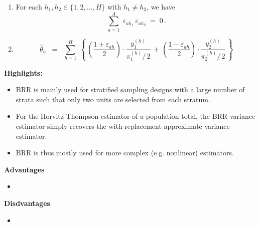\begin{proposition}
\begin{enumerate}
\item
	For each $h_{1}, h_{2} \in \{1,2,\ldots,H\}$ with $h_{1} \neq h_{2}$, we have
	\begin{equation*}
	\overset{A}{\underset{a=1}{\sum}}\;\varepsilon_{ah_{1}}\,\varepsilon_{ah_{2}} \; = \; 0\,.
	\end{equation*}
\item
	\begin{equation*}
	\widehat{\theta}_{a}
	\;\; = \;\;
		\overset{H}{\underset{h=1}{\sum}}\;
		\left\{\,
			\left(\dfrac{1+\varepsilon_{ah}}{2}\right)\cdot\dfrac{y^{(h)}_{1}}{\pi^{(h)}_{1}/\,2}
			\,+\,
			\left(\dfrac{1-\varepsilon_{ah}}{2}\right)\cdot\dfrac{y^{(h)}_{2}}{\pi^{(h)}_{2}/\,2}
			\,\right\}
	\end{equation*}
\end{enumerate}
\end{proposition}

\vskip 0.5cm
\textbf{Highlights:}
\begin{itemize}
\item
	BRR is mainly used for stratified sampling designs
	with a large number of strata such that only
	two units are selected from each stratum.
\item
	For the Horvitz-Thompson estimator of a population total,
	the BRR variance estimator simply recovers the
	with-replacement approximate variance estimator.
\item
	BRR is thus mostly used for more complex (e.g. nonlinear) estimators.
\end{itemize}

\vskip 0.5cm
\noindent
\textbf{Advantages}
\begin{itemize}
\item

\end{itemize}

\vskip 0.5cm
\noindent
\textbf{Disdvantages}
\begin{itemize}
\item

\end{itemize}

